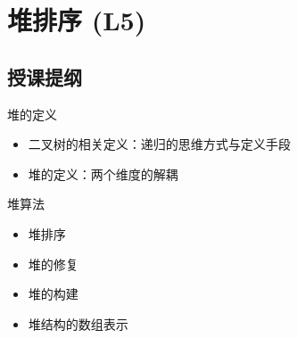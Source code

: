 \chapter{堆排序 (L5)} \label{chap:heap-sort}


\section*{授课提纲}


\nid 堆的定义
\begin{itemize}
    \item 二叉树的相关定义：递归的思维方式与定义手段
    \item 堆的定义：两个维度的解耦
\end{itemize}

\nid 堆算法
\begin{itemize}
    \item 堆排序
    \item 堆的修复
    \item 堆的构建
    \item 堆结构的数组表示
\end{itemize}